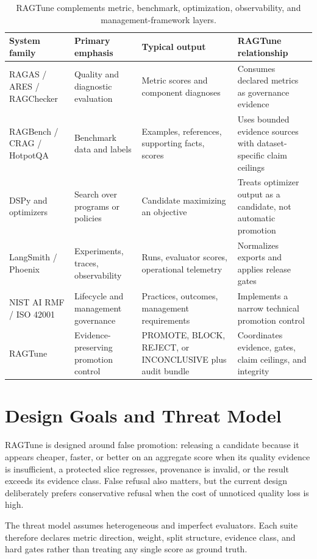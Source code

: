 \documentclass[11pt]{article}
\begin{document}
\begin{table}[t]
\centering
\caption{RAGTune complements metric, benchmark, optimization, observability, and management-framework layers.}
\small
\begin{tabularx}{\linewidth}{>{\raggedright\arraybackslash}X>{\raggedright\arraybackslash}X>{\raggedright\arraybackslash}X>{\raggedright\arraybackslash}X}
\toprule
\textbf{System family} & \textbf{Primary emphasis} & \textbf{Typical output} & \textbf{RAGTune relationship} \\
\midrule
RAGAS / ARES / RAGChecker & Quality and diagnostic evaluation & Metric scores and component diagnoses & Consumes declared metrics as governance evidence \\
RAGBench / CRAG / HotpotQA & Benchmark data and labels & Examples, references, supporting facts, scores & Uses bounded evidence sources with dataset-specific claim ceilings \\
DSPy and optimizers & Search over programs or policies & Candidate maximizing an objective & Treats optimizer output as a candidate, not automatic promotion \\
LangSmith / Phoenix & Experiments, traces, observability & Runs, evaluator scores, operational telemetry & Normalizes exports and applies release gates \\
NIST AI RMF / ISO 42001 & Lifecycle and management governance & Practices, outcomes, management requirements & Implements a narrow technical promotion control \\
RAGTune & Evidence-preserving promotion control & PROMOTE, BLOCK, REJECT, or INCONCLUSIVE plus audit bundle & Coordinates evidence, gates, claim ceilings, and integrity \\
\bottomrule
\end{tabularx}
\end{table}

\section{Design Goals and Threat Model}
RAGTune is designed around false promotion: releasing a candidate because it appears cheaper, faster, or better on an aggregate score when its quality evidence is insufficient, a protected slice regresses, provenance is invalid, or the result exceeds its evidence class. False refusal also matters, but the current design deliberately prefers conservative refusal when the cost of unnoticed quality loss is high.

The threat model assumes heterogeneous and imperfect evaluators. Each suite therefore declares metric direction, weight, split structure, evidence class, and hard gates rather than treating any single score as ground truth.
\end{document}
